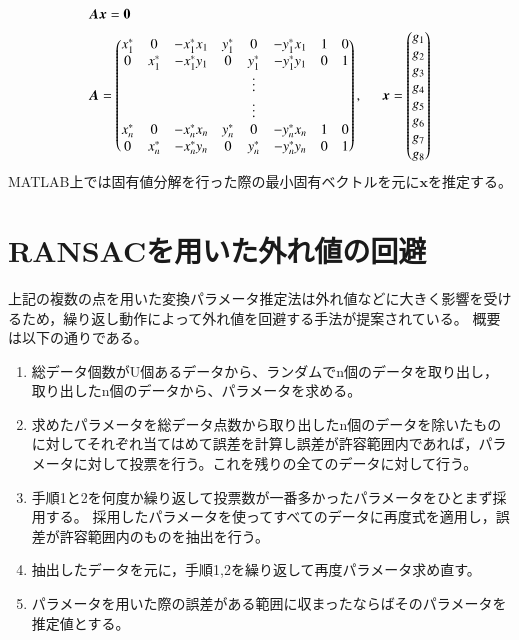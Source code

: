 \documentclass[fleqn]{jreport}
\begin{document}
\begin{align}
&\mbox{\boldmath $Ax$}=\mbox{\boldmath $0$}\label{eq:HLinear} \\
&\mbox{\boldmath $A$}=\begin{pmatrix}
x^*_1 & 0 & -x^*_1 x_1 & y^*_1 & 0 & -y^*_1 x_1& 1 & 0  \\ 
0 & x^*_1 & -x^*_1 y_1 & 0 & y^*_1 & -y^*_1 y_1& 0 & 1 \\
& & & & \vdots & & &\\
& & & & \vdots & & &\\
x^*_n & 0 & -x^*_n x_n & y^*_n & 0 & -y^*_n x_n& 1 & 0  \\ 
0 & x^*_n & -x^*_n y_n & 0 & y^*_n & -y^*_n y_n& 0 & 1
\end{pmatrix},\hspace{5mm}
\mbox{\boldmath $x$} = \begin{pmatrix}
g_1 \\ 
g_2 \\ 
g_3 \\ 
g_4 \\ 
g_5 \\ 
g_6 \\
g_7 \\
g_8
\end{pmatrix} \nonumber
\end{align}
MATLAB上では固有値分解を行った際の最小固有ベクトルを元に$\bm{x}$を推定する。

\section{RANSACを用いた外れ値の回避}
上記の複数の点を用いた変換パラメータ推定法は外れ値などに大きく影響を受けるため，繰り返し動作によって外れ値を回避する手法が提案されている。
概要は以下の通りである。
\begin{enumerate}
\item 総データ個数がU個あるデータから、ランダムでn個のデータを取り出し，取り出したn個のデータから、パラメータを求める。
\item 求めたパラメータを総データ点数から取り出したn個のデータを除いたものに対してそれぞれ当てはめて誤差を計算し誤差が許容範囲内であれば，パラメータに対して投票を行う。これを残りの全てのデータに対して行う。
\item 手順1と2を何度か繰り返して投票数が一番多かったパラメータをひとまず採用する。
採用したパラメータを使ってすべてのデータに再度式を適用し，誤差が許容範囲内のものを抽出を行う。
\item 抽出したデータを元に，手順1,2を繰り返して再度パラメータ求め直す。
\item パラメータを用いた際の誤差がある範囲に収まったならばそのパラメータを推定値とする。
\end{enumerate}
\end{document}
